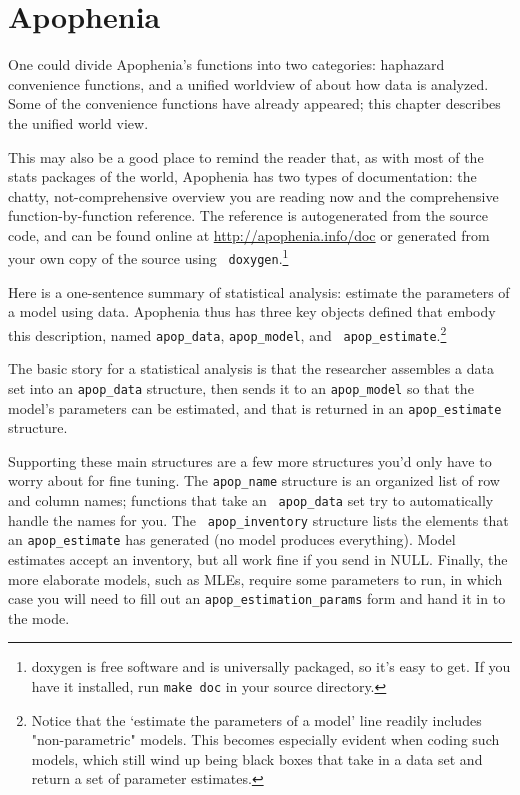 \chapter{Apophenia} \label{apop}

One could divide Apophenia's functions into two categories: haphazard
convenience functions, and a unified worldview of about how data is
analyzed. Some of the convenience functions have already appeared; this
chapter describes the unified world view. 

This may also be a good place to remind the reader that, as with most of
the stats packages of the world, Apophenia has two types of
documentation: the chatty, not-comprehensive overview you are reading now and the
comprehensive function-by-function reference. The reference is autogenerated from the
source code, and can be found online at \url{http://apophenia.info/doc}
or generated from your own copy of the source using {\tt
doxygen}.\footnote{doxygen is free software and is universally packaged,
so it's easy to get. If you have it installed, run {\tt make doc} in
your source directory.}

Here is a one-sentence summary of statistical analysis: estimate the
parameters of a model
using data. Apophenia thus has three key objects defined that embody
this description, named {\tt apop\_data}, {\tt apop\_model}, and {\tt
apop\_estimate}.\footnote{Notice that the `estimate the parameters of a
model' line readily includes "non-parametric" models. This becomes
especially evident when coding such models, which still wind up being
black boxes that take in a data set and return a set of parameter
estimates.}

The basic story for a statistical analysis is that the researcher
assembles a data set into an {\tt apop\_data} structure, then sends it to
an {\tt apop\_model} so that the model's parameters can be estimated,
and that is returned in an {\tt apop\_estimate} structure.

Supporting these main structures are a few more structures you'd only
have to worry about for fine tuning.  The {\tt apop\_name} structure is
an organized list of row and column names; functions that take an {\tt
apop\_data} set try to automatically handle the names for you.  The {\tt
apop\_inventory} structure lists the elements that an {\tt apop\_estimate}
has generated (no model produces everything). Model estimates accept
an inventory, but all work fine if you send in NULL. Finally, the more
elaborate models, such as MLEs, require some parameters to run, in
which case you will need to fill out an {\tt apop\_estimation\_params}
form and hand it in to the mode.


